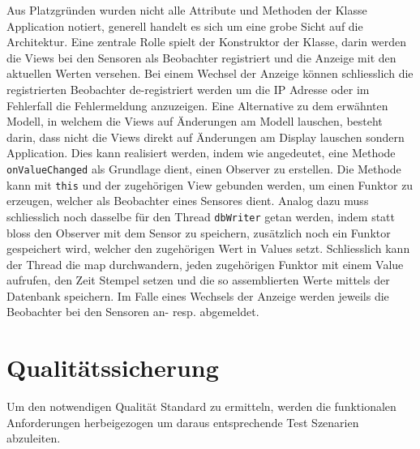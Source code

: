 \documentclass[
    10pt,
    a4paper,
]{scrartcl}
\begin{document}
Aus Platzgründen wurden nicht alle Attribute und Methoden der Klasse Application
notiert, generell handelt es sich um eine grobe Sicht auf die Architektur. Eine zentrale
Rolle spielt der Konstruktor der Klasse, darin werden die Views bei den Sensoren als
Beobachter registriert und die Anzeige mit den aktuellen Werten versehen. Bei einem
Wechsel der Anzeige können schliesslich die registrierten Beobachter de-registriert werden
um die IP Adresse oder im Fehlerfall die Fehlermeldung anzuzeigen. Eine Alternative zu dem
erwähnten Modell, in welchem die Views auf Änderungen am Modell lauschen, besteht darin,
dass nicht die Views direkt auf Änderungen am Display lauschen sondern
Application. Dies kann realisiert werden, indem wie angedeutet, eine Methode
\texttt{onValueChanged} als Grundlage dient, einen Observer zu erstellen. Die Methode kann
mit \texttt{this} und der zugehörigen View gebunden werden, um einen Funktor zu erzeugen,
welcher als Beobachter eines Sensores dient. Analog dazu muss schliesslich noch dasselbe
für den Thread \texttt{dbWriter} getan werden, indem statt bloss den Observer mit dem
Sensor zu speichern, zusätzlich noch ein Funktor gespeichert wird, welcher den zugehörigen
Wert in Values setzt. Schliesslich kann der Thread die map durchwandern, jeden zugehörigen
Funktor mit einem Value aufrufen, den Zeit Stempel setzen und die so assemblierten Werte
mittels der Datenbank speichern. Im Falle eines Wechsels der Anzeige werden jeweils die
Beobachter bei den Sensoren an- resp. abgemeldet.

\section{Qualitätssicherung}
Um den notwendigen Qualität Standard zu ermitteln, werden die funktionalen Anforderungen
herbeigezogen um daraus entsprechende Test Szenarien abzuleiten.
\end{document}
